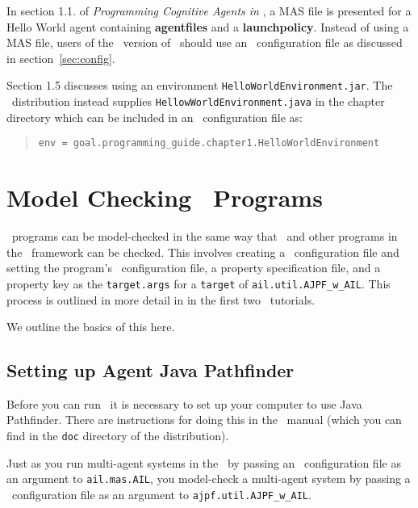 In section 1.1. of \emph{Programming Cognitive Agents in \goal}, a MAS file is presented for a Hello World agent containing {\bf agentfiles} and a {\bf launchpolicy}.  Instead of using a MAS file, users of the \ail\ version of \goal\ should use an \ail\ configuration file as discussed in section~\ref{sec:config}.

Section 1.5 discusses using an environment \texttt{HelloWorldEnvironment.jar}.  The \mcapl\ distribution instead supplies \texttt{HellowWorldEnvironment.java} in the chapter directory which can be included in an \ail\ configuration file as:

\begin{quote}
  \texttt{env = goal.programming\_guide.chapter1.HelloWorldEnvironment}
\end{quote}

\section{Model Checking \goal\ Programs}

\goal\ programs can be model-checked in the same way that \gwendolen\ and other programs in the \ail\ framework can be checked.  This involves creating a \jpf\ configuration file and setting the program's \ail\ configuration file, a property specification file, and a property key as the \texttt{target.args} for a \texttt{target} of \texttt{ail.util.AJPF\_w\_AIL}.  This process is outlined in more detail in in the first two \ajpf\ tutorials.

We outline the basics of this here.

\subsection{Setting up Agent Java Pathfinder}
Before you can run \ajpf\ it is necessary to set up your computer to use Java Pathfinder.  There are instructions for doing this in the \mcapl\ manual (which you can find in the \texttt{doc} directory of the distribution).

Just as you run multi-agent systems in the \ail\ by passing an \ail\ configuration file as an argument to \texttt{ail.mas.AIL}, you model-check a multi-agent system by passing a \jpf\ configuration file as an argument to \texttt{ajpf.util.AJPF\_w\_AIL}.

